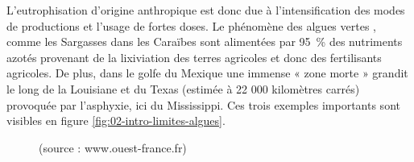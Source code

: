 \documentclass[../thesis.tex]{subfiles}
\begin{document}
    \par L'eutrophisation d'origine anthropique est donc due à l'intensification des modes de productions et l'usage de fortes doses. Le phénomène des algues vertes \cite{léraud2019algues}, comme les Sargasses dans les Caraïbes \cite{louime2017sargassum} sont alimentées par \SI{95}{\percent} des nutriments azotés provenant de la lixiviation des terres agricoles et donc des fertilisants agricoles. De plus, dans le golfe du Mexique une immense « zone morte » grandit le long de la Louisiane et du Texas (estimée à 22 000 kilomètres carrés) provoquée par l'asphyxie, ici du Mississippi. Ces trois exemples importants sont visibles en figure \ref{fig:02-intro-limites-algues}.
    
    \vfill
    \begin{figure}[H]
        \centering
        {\scriptsize (source : www.ouest-france.fr) } \\
        

\end{figure}
\end{document}
